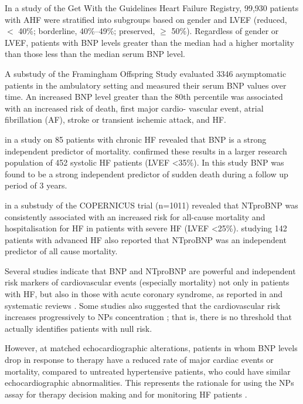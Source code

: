 \documentclass[14pt,a4paper,onecolumn]{extarticle}
\begin{document}
In a study of the Get With the Guidelines Heart Failure Registry, 99,930 patients with AHF were stratified into subgroups based on gender and LVEF (reduced, $<$ 40\%; borderline, 40\%–49\%; preserved, $\geq$ 50\%). Regardless of gender or LVEF, patients with BNP levels greater than the median had a higher mortality than those less than the median serum BNP level. \citep{Hsich2013}  %

A substudy of the Framingham Offspring Study evaluated 3346 asymptomatic patients in the ambulatory setting and measured their serum BNP values over time. An increased BNP level greater than the 80th percentile was associated with an increased risk of death, first major cardio- vascular event, atrial fibrillation (AF), stroke or transient ischemic attack, and HF. \citep{Wang2004c} %

\citep{Tsutamoto1997} in a study on 85 patients with chronic HF revealed that BNP is a strong independent predictor of mortality.  \citep{Berger2002} confirmed these results in a larger research population of 452 systolic HF patients (LVEF <35\%). In this study BNP was found to be a strong independent predictor of sudden death during a follow up period of 3 years.

\citep{Hartmann2004} in a substudy of the COPERNICUS trial (n=1011) revealed that NTproBNP was consistently associated with an increased risk for all-cause mortality and hospitalisation for HF in patients with severe HF (LVEF <25\%). \citep{Gardner2003b} studying 142 patients with advanced HF also reported that NTproBNP was an independent predictor of all cause mortality.

Several studies indicate that BNP and NTproBNP are powerful and independent risk markers of cardiovascular events (especially mortality) not only in patients with HF, but also in those with acute coronary syndrome, as reported in  and systematic reviews \citep{bib35} \citep{bib376} \citep{bib377} \citep{bib378}. Some studies also suggested that the cardiovascular risk increases progressively to NPs concentration \citep{bib377} \citep{bib378} \citep{bib3194}; that is, there is no threshold that actually identifies patients with null risk.

However, at matched echocardiographic alterations, patients in whom BNP levels drop in response to therapy have a reduced rate of major cardiac events or mortality, compared to untreated hypertensive patients, who could have similar echocardiographic abnormalities. This represents the rationale for using the NPs assay for therapy decision making and for monitoring HF patients \citep{bib35} \citep{bib363} \citep{bib364}.
\end{document}

